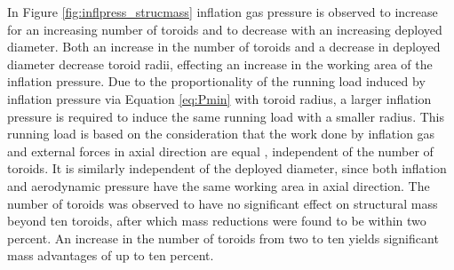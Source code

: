In Figure \ref{fig:inflpress_strucmass} inflation gas pressure is observed to increase for an increasing number of toroids and to decrease with an increasing deployed diameter. Both an increase in the number of toroids and a decrease in deployed diameter decrease toroid radii, effecting an increase in the working area of the inflation pressure. Due to the proportionality of the running load induced by inflation pressure via Equation \ref{eq:Pmin} with toroid radius, a larger inflation pressure is required to induce the same running load with a smaller radius. This running load is based on the consideration that the work done by inflation gas and external forces in axial direction are equal \cite{Brown2009}, independent of the number of toroids. It is similarly independent of the deployed diameter, since both inflation and aerodynamic pressure have the same working area in axial direction.
The number of toroids was observed to have no significant effect on structural mass beyond ten toroids, after which mass reductions were found to be within two percent. An increase in the number of toroids from two to ten yields significant mass advantages of up to ten percent. 



